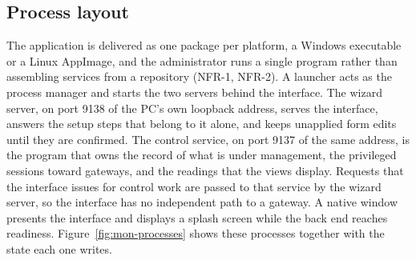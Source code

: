 \documentclass[12pt,a4paper]{report}
\begin{document}
\subsection{Process layout}
\label{sec:mon-processes}

The application is delivered as one package per platform, a
Windows executable or a Linux AppImage, and the administrator runs
a single program rather than assembling services from a repository
(NFR-1, NFR-2). A launcher acts as the process manager and starts
the two servers behind the interface. The wizard server, on port
9138 of the PC's own loopback address, serves the interface, answers
the setup steps that belong to it alone, and keeps unapplied form
edits until they are confirmed. The control service, on port 9137 of
the same address, is the program that owns the record of what is
under management, the privileged sessions toward gateways, and the
readings that the views display. Requests that the interface issues
for control work are passed to that service by the wizard server, so
the interface has no independent path to a gateway. A native window
presents the interface and displays a splash screen while the back
end reaches readiness. Figure~\ref{fig:mon-processes} shows these
processes together with the state each one writes.
\end{document}
